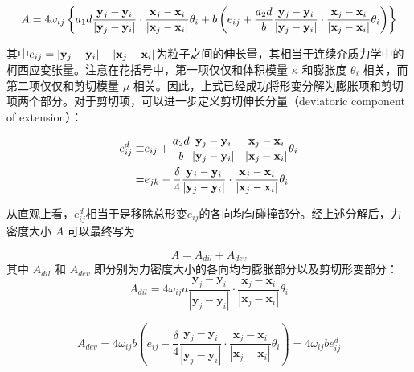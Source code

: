 \begin{equation}
\begin{aligned}
A =4\omega_{ij}\left\{a_1d\frac{\mathbf{y}_j-\mathbf{y}_i}{|\mathbf{y}_j-\mathbf{y}_i|}\cdot\frac{\mathbf{x}_j-\mathbf{x}_i}{|\mathbf{x}_j-\mathbf{x}_i|}\theta_i
   +b\left(e_{ij} + \frac{a_2d}{b}\frac{\mathbf{y}_j-\mathbf{y}_i}{|\mathbf{y}_j-\mathbf{y}_i|}\cdot\frac{\mathbf{x}_j-\mathbf{x}_i}{|\mathbf{x}_j-\mathbf{x}_i|}\theta_i\right) \right\}
\end{aligned}
\end{equation}

其中$e_{ij} = |\mathbf{y}_j - \mathbf{y}_i| - |\mathbf{x}_j - \mathbf{x}_i|$为粒子之间的伸长量，其相当于连续介质力学中的柯西应变张量。注意在花括号中，第一项仅仅和体积模量 $\kappa$ 和膨胀度 $\theta_i$ 相关，而第二项仅仅和剪切模量 $\mu$ 相关。因此，上式已经成功将形变分解为膨胀项和剪切项两个部分。对于剪切项，可以进一步定义剪切伸长分量（deviatoric component of extension）：

\begin{equation}
\begin{aligned}
e^d_{ij} \equiv& e_{ij} + \frac{a_2d}{b}\frac{\mathbf{y}_j-\mathbf{y}_i}{|\mathbf{y}_j-\mathbf{y}_i|}\cdot\frac{\mathbf{x}_j-\mathbf{x}_i}{|\mathbf{x}_j-\mathbf{x}_i|}\theta_i\\
                  =& e_{jk} - \frac{\delta}{4}\frac{\mathbf{y}_j-\mathbf{y}_i}{|\mathbf{y}_j-\mathbf{y}_i|}\cdot\frac{\mathbf{x}_j-\mathbf{x}_i}{|\mathbf{x}_j-\mathbf{x}_i|}\theta_i
\end{aligned}
\label{deviatoric_extension}
\end{equation}

从直观上看，$e^d_{ij}$相当于是移除总形变$e_{ij}$的各向均匀碰撞部分。经上述分解后，力密度大小 $A$ 可以最终写为

\begin{equation}
A = A_{dil} + A_{dev}
\end{equation}
其中 $A_{dil}$ 和 $A_{dev}$ 即分别为力密度大小的各向均匀膨胀部分以及剪切形变部分：
\begin{equation}
A_{dil}=4\omega_{ij}a\frac{\mathbf{y}_j-\mathbf{y}_i}{|\mathbf{y}_j-\mathbf{y}_i|}\cdot\frac{\mathbf{x}_j-\mathbf{x}_i}{|\mathbf{x}_j-\mathbf{x}_i|}\theta_i
\end{equation}

\begin{equation}
A_{dev}=4\omega_{ij}b(e_{ij}-\frac{\delta}{4}\frac{\mathbf{y}_j-\mathbf{y}_i}{|\mathbf{y}_j-\mathbf{y}_i|}\cdot\frac{\mathbf{x}_j-\mathbf{x}_i}{|\mathbf{x}_j-\mathbf{x}_i|}\theta_i)
       =4\omega_{ij}be^d_{ij}
\label{Adev}
\end{equation}

